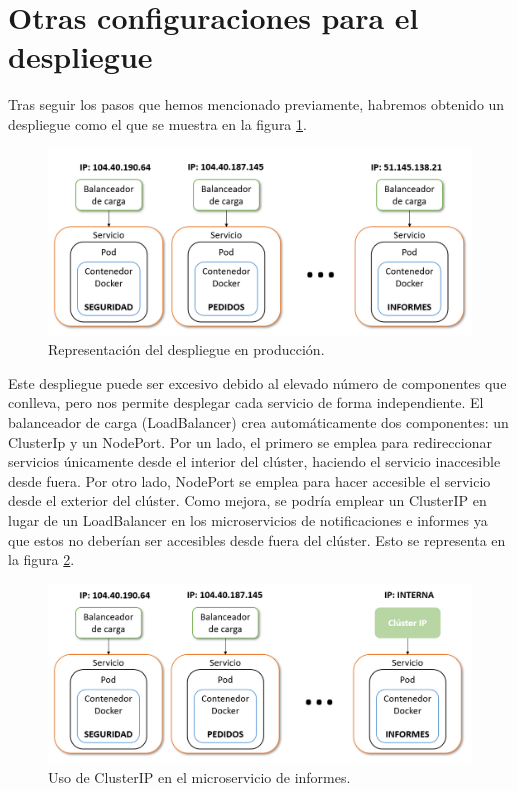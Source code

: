 \documentclass[11pt,spanish,listoffigures]{tfgetsinf}
\begin{document}
\newpage

\section{Otras configuraciones para el despliegue} \label{sect:DespliegueOtros}

Tras seguir los pasos que hemos mencionado previamente, habremos obtenido un despliegue como el que se muestra en la figura \ref{fig:DespliegueProduccion}.

\begin{figure}[h]
\centering
\includegraphics[scale=0.65]{DespliegueProduccion}
\caption{Representación del despliegue en producción.}
\label{fig:DespliegueProduccion}
\end{figure}

Este despliegue puede ser excesivo debido al elevado número de componentes que conlleva, pero nos permite desplegar cada servicio de forma independiente. El balanceador de carga (LoadBalancer) crea automáticamente dos componentes: un ClusterIp y un NodePort. Por un lado, el primero se emplea para redireccionar servicios únicamente desde el interior del clúster, haciendo el servicio inaccesible desde fuera. Por otro lado, NodePort se emplea para hacer accesible el servicio desde el exterior del clúster. Como mejora, se podría emplear un ClusterIP en lugar de un LoadBalancer en los microservicios de notificaciones e informes ya que estos no deberían ser accesibles desde fuera del clúster. Esto se representa en la figura \ref{fig:ClusterIP}.

\begin{figure}[h]
\centering
\includegraphics[scale=0.65]{ClusterIP}
\caption{Uso de ClusterIP en el microservicio de informes.}
\label{fig:ClusterIP}
\end{figure}
\end{document}
